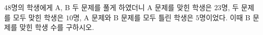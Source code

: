 $48$명의 학생에게 A, B 두 문제를 풀게 하였더니 A 문제를 맞힌 학생은 $23$명, 두 문제를 모두 맞힌 학생은 $10$명, A 문제와 B 문제를 모두 틀린 학생은 $5$명이었다. 이때 B 문제를 맞힌 학생 수를 구하시오.
